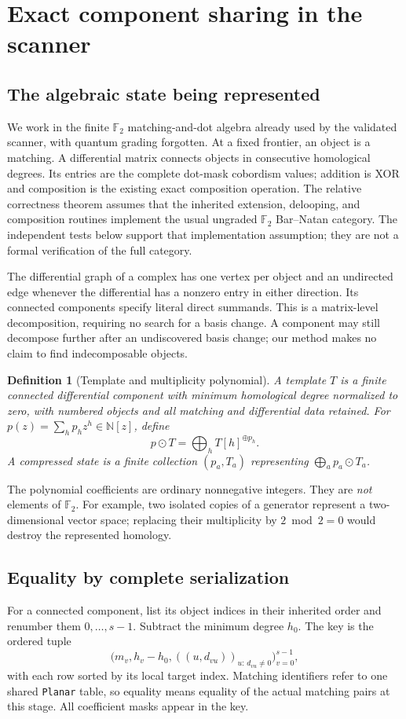 \documentclass[11pt,letterpaper]{article}
\newtheorem{definition}[theorem]{Definition}
\newcommand{\F}{\mathbb F_2}
\newcommand{\N}{\mathbb N}
\newcommand{\code}[1]{\texttt{#1}}
\begin{document}
\section{Exact component sharing in the scanner}
\label{sec:sharing}

\subsection{The algebraic state being represented}
We work in the finite $\F$ matching-and-dot algebra already used by the
validated scanner, with quantum grading forgotten. At a fixed frontier, an
object is a matching. A differential matrix connects objects in consecutive
homological degrees. Its entries are the complete dot-mask cobordism values;
addition is XOR and composition is the existing exact composition operation.
The relative correctness theorem assumes that the inherited extension,
delooping, and composition routines implement the usual ungraded $\F$
Bar--Natan category. The independent tests below support that implementation
assumption; they are not a formal verification of the full category.

The differential graph of a complex has one vertex per object and an
undirected edge whenever the differential has a nonzero entry in either
direction. Its connected components specify literal direct summands. This
is a matrix-level decomposition, requiring no search for a basis change.
A component may still decompose further after an undiscovered basis change;
our method makes no claim to find indecomposable objects.

\begin{definition}[Template and multiplicity polynomial]
A template $T$ is a finite connected differential component with minimum
homological degree normalized to zero, with numbered objects and all
matching and differential data retained. For
$p(z)=\sum_h p_hz^h\in\N[z]$, define
\[
 p\odot T=\bigoplus_h T[h]^{\oplus p_h}.
\]
A compressed state is a finite collection $(p_a,T_a)$ representing
$\bigoplus_a p_a\odot T_a$.
\end{definition}

The polynomial coefficients are ordinary nonnegative integers. They are
\emph{not} elements of $\F$. For example, two isolated copies of a generator
represent a two-dimensional vector space; replacing their multiplicity by
$2\bmod2=0$ would destroy the represented homology.

\subsection{Equality by complete serialization}
For a connected component, list its object indices in their inherited
order and renumber them $0,\ldots,s-1$. Subtract the minimum degree $h_0$.
The key is the ordered tuple
\begin{equation}\label{eq:key}
 \bigl(m_v,h_v-h_0,((u,d_{vu}))_{u:\,d_{vu}\ne0}\bigr)_{v=0}^{s-1},
\end{equation}
with each row sorted by its local target index. Matching identifiers refer
to one shared \code{Planar} table, so equality means equality of the actual
matching pairs at this stage. All coefficient masks appear in the key.
\end{document}
